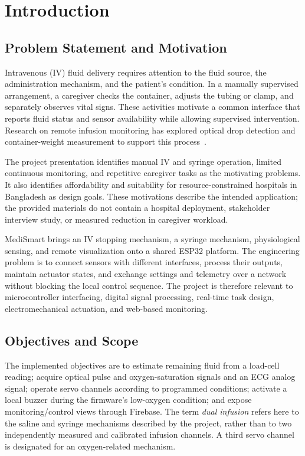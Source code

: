 \section{Introduction}\label{sec:introduction}
\subsection{Problem Statement and Motivation}
Intravenous (IV) fluid delivery requires attention to the fluid source, the administration mechanism, and the patient's condition. In a manually supervised arrangement, a caregiver checks the container, adjusts the tubing or clamp, and separately observes vital signs. These activities motivate a common interface that reports fluid status and sensor availability while allowing supervised intervention. Research on remote infusion monitoring has explored optical drop detection and container-weight measurement to support this process~\cite{lee2021}.

The project presentation identifies manual IV and syringe operation, limited continuous monitoring, and repetitive caregiver tasks as the motivating problems. It also identifies affordability and suitability for resource-constrained hospitals in Bangladesh as design goals. These motivations describe the intended application; the provided materials do not contain a hospital deployment, stakeholder interview study, or measured reduction in caregiver workload.

MediSmart brings an IV stopping mechanism, a syringe mechanism, physiological sensing, and remote visualization onto a shared ESP32 platform. The engineering problem is to connect sensors with different interfaces, process their outputs, maintain actuator states, and exchange settings and telemetry over a network without blocking the local control sequence. The project is therefore relevant to microcontroller interfacing, digital signal processing, real-time task design, electromechanical actuation, and web-based monitoring.

\subsection{Objectives and Scope}
The implemented objectives are to estimate remaining fluid from a load-cell reading; acquire optical pulse and oxygen-saturation signals and an ECG analog signal; operate servo channels according to programmed conditions; activate a local buzzer during the firmware's low-oxygen condition; and expose monitoring/control views through Firebase. The term \emph{dual infusion} refers here to the saline and syringe mechanisms described by the project, rather than to two independently measured and calibrated infusion channels. A third servo channel is designated for an oxygen-related mechanism.

